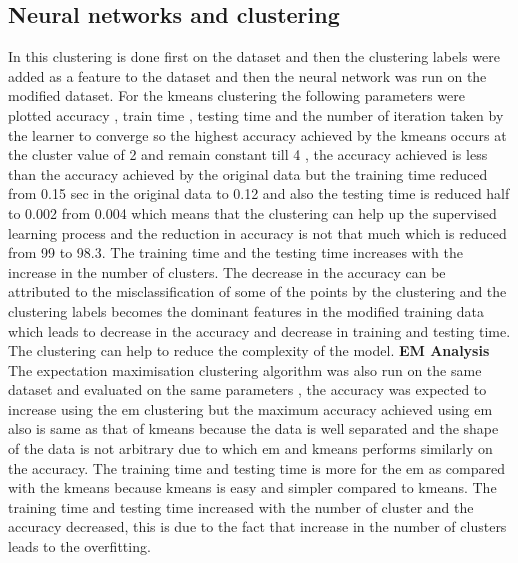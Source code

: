 \documentclass[a4paper,12pt]{article}
\begin{document}
\subsection { Neural networks and clustering }  In this clustering is done first on the dataset and then the clustering labels were added as a feature to the dataset and then the neural network was run on the modified dataset. For the kmeans clustering the following parameters were plotted accuracy , train time , testing time and the number of iteration taken by the learner to converge so the highest accuracy achieved by the kmeans occurs at the cluster value of 2 and remain constant till 4 , the accuracy achieved is less than the accuracy achieved by the original data but the training time reduced from 0.15 sec in the original data to 0.12 and also the testing time is reduced half to 0.002 from 0.004 which means that the clustering can help up the supervised learning process and the reduction in accuracy is not that much which is reduced from 99 to 98.3.  The training time and the testing time increases with the increase in the number of clusters. The decrease in the accuracy can be attributed to the misclassification of some of the points by the clustering and the clustering labels becomes the dominant features in the modified training data which leads to decrease in the accuracy and decrease in training and testing time. The clustering can help to reduce the complexity of the model. \newline
\textbf{ EM Analysis } The expectation maximisation clustering algorithm was also run on the same dataset and evaluated on the same parameters , the accuracy was expected to increase using the em clustering but the maximum accuracy achieved using em also is same as that of kmeans because the data  is well separated and the shape of the data is not arbitrary due to which em and kmeans performs similarly on the accuracy. The training time and testing time is more for the em as compared with the kmeans because kmeans is easy and simpler compared to kmeans. The training time and testing time increased with the number of cluster and the accuracy decreased, this is due to the fact that increase in the number of clusters leads to the overfitting.
\end{document}
